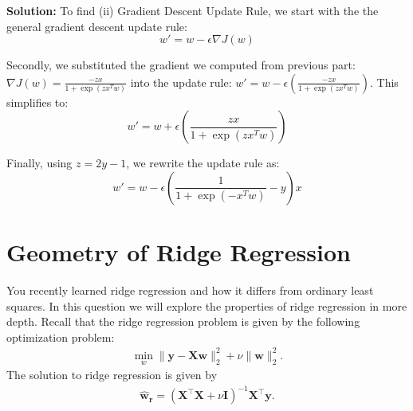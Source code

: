 \documentclass{article}
\newcommand{\mat}[1]{\mathbf{#1}}
\renewcommand{\vec}[1]{\boldsymbol{\mathbf{#1}}}
\newcommand{\Question}[1]{\Large \section{ #1 } \normalsize}
\newenvironment{solution}{\color{blue} \smallskip \textbf{Solution:}}{}
\begin{document}
\begin{enumerate}[(a)]
\begin{enumerate}[(i)]
\begin{solution}
To find (ii) Gradient Descent Update Rule, we start with the the general gradient descent update rule:
\[
w' = w - \epsilon \nabla J(w)
\]

Secondly, we substituted the gradient we computed from previous part:
\(
\nabla J(w) = \frac{-z x}{1 + \exp(z x^T w)}
\) into the update rule:
\(
w' = w - \epsilon \left( \frac{-z x}{1 + \exp(z x^T w)} \right)
\). This simplifies to:
\[
w' = w + \epsilon \left( \frac{z x}{1 + \exp(z x^T w)} \right)
\]

Finally, using \( z = 2y - 1 \), we rewrite the update rule as:
\[
w' = w - \epsilon \left( \frac{1}{1 + \exp(-x^T w)} - y \right) x
\]



        \end{solution}
    \end{enumerate}
\end{enumerate}

\newpage
\Question{Geometry of Ridge Regression}
You recently learned ridge regression and how it differs from ordinary least squares. In this question we will explore the properties of ridge regression in more depth. Recall that the ridge regression problem is given by the following optimization problem:
\begin{align}
    \min_{w} \|\vec{y} - \mat{X} \vec{w}\|_2^2 + \nu \|\vec{w}\|_2^2. \label{eq:ridge}
\end{align}
The solution to ridge regression is given by
\begin{align}
\vec{\hat{w}_{r}} = (\mat{X}^\top \mat{X} + \nu \mat{I})^{-1} \mat{X}^\top \vec{y}. \label{eq:ridge_sol}
\end{align}
\end{document}
